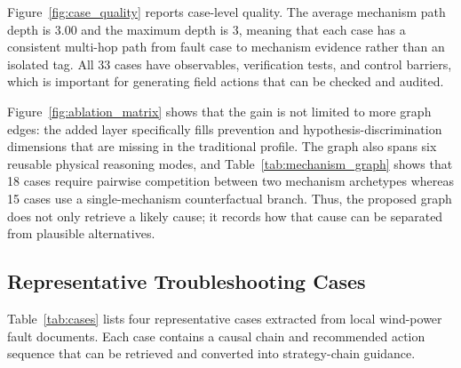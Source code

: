\documentclass[lettersize,journal]{IEEEtran}
\begin{document}
Figure~\ref{fig:case_quality} reports case-level quality. The average mechanism path depth is 3.00 and the maximum depth is 3, meaning that each case has a consistent multi-hop path from fault case to mechanism evidence rather than an isolated tag. All 33 cases have observables, verification tests, and control barriers, which is important for generating field actions that can be checked and audited.

Figure~\ref{fig:ablation_matrix} shows that the gain is not limited to more graph edges: the added layer specifically fills prevention and hypothesis-discrimination dimensions that are missing in the traditional profile. The graph also spans six reusable physical reasoning modes, and Table~\ref{tab:mechanism_graph} shows that 18 cases require pairwise competition between two mechanism archetypes whereas 15 cases use a single-mechanism counterfactual branch. Thus, the proposed graph does not only retrieve a likely cause; it records how that cause can be separated from plausible alternatives.

\subsection{Representative Troubleshooting Cases}
Table~\ref{tab:cases} lists four representative cases extracted from local wind-power fault documents. Each case contains a causal chain and recommended action sequence that can be retrieved and converted into strategy-chain guidance.
\end{document}
